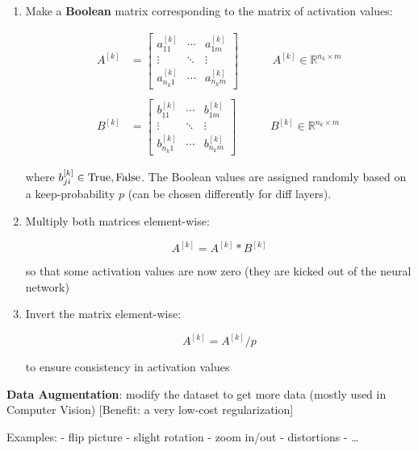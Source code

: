 \documentclass[
]{book}
\begin{document}
\begin{enumerate}
\def\labelenumi{\arabic{enumi}.}
\item
  Make a \textbf{Boolean} matrix corresponding to the matrix of
  activation values:

  \[\begin{align}
   A^{[k]}&=\begin{bmatrix}
   a_{11}^{[k]} & \cdots & a_{1m}^{[k]} \\
   \vdots & \ddots & \vdots \\ 
   a_{n_k1}^{[k]} & \cdots & a_{n_km}^{[k]}
   \end{bmatrix}\quad\quad\quad A^{[k]}\in\mathbb{R}^{n_k\times m} \\ \\
   B^{[k]}&=\begin{bmatrix}
   b_{11}^{[k]} & \cdots & b_{1m}^{[k]} \\
   \vdots & \ddots & \vdots \\ 
   b_{n_k1}^{[k]} & \cdots & b_{n_km}^{[k]}
   \end{bmatrix}\quad\quad\quad B^{[k]}\in\mathbb{R}^{n_k\times m}
   \end{align}\]

  where \(b_{ji}^{[k]}\in\\{\text{True}, \text{False}\\}\). The Boolean
  values are assigned randomly based on a keep-probability \(p\) (can be
  chosen differently for diff layers).
\item
  Multiply both matrices element-wise:

  \[\begin{equation}
   A^{[k]}=A^{[k]}* B^{[k]}
   \end{equation}\]

  so that some activation values are now zero (they are kicked out of
  the neural network)
\item
  Invert the matrix element-wise:

  \[\begin{equation}
   A^{[k]}=A^{[k]}/p
   \end{equation}\]

  to ensure consistency in activation values
\end{enumerate}

\textbf{Data Augmentation}: modify the dataset to get more data (mostly
used in Computer Vision) {[}Benefit: a very low-cost regularization{]}

Examples: - flip picture - slight rotation - zoom in/out - distortions -
\ldots{}
\end{document}
